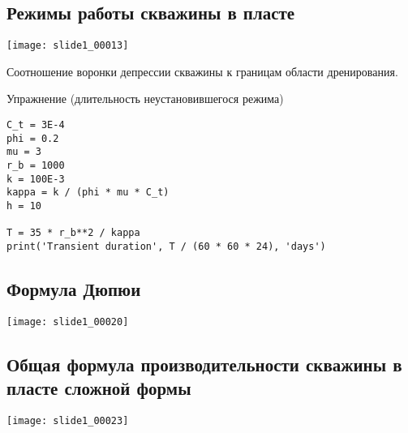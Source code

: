 \documentclass[main.tex]{subfiles}
\begin{document}
\subsection{Режимы работы скважины в пласте}
\texttt{[image: slide1\_00013]}





Соотношение воронки депрессии скважины к границам области дренирования.

Упражнение (длительность неустановившегося режима)

\begin{listing}[h]
\begin{verbatim}
C_t = 3E-4
phi = 0.2
mu = 3
r_b = 1000
k = 100E-3
kappa = k / (phi * mu * C_t)
h = 10

T = 35 * r_b**2 / kappa
print('Transient duration', T / (60 * 60 * 24), 'days')
\end{verbatim}
\end{listing}

\subsection{Формула Дюпюи}
\texttt{[image: slide1\_00020]}



\subsection{Общая формула производительности скважины в пласте сложной формы}

\texttt{[image: slide1\_00023]}










\end{document}
